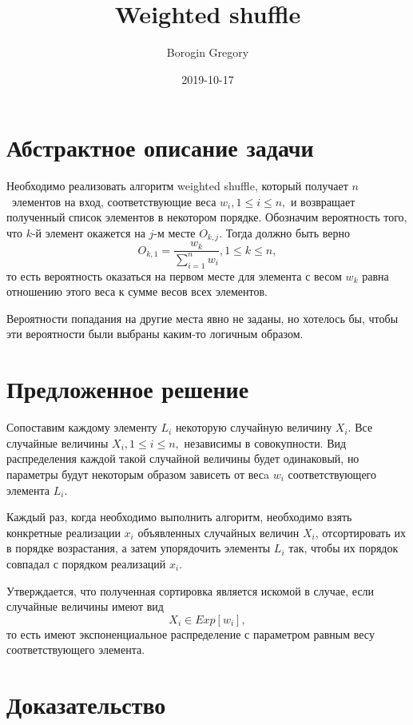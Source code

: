\documentclass{article}
\title{Weighted shuffle}
\date{2019-10-17}
\author{Borogin Gregory}
\begin{document}
    \maketitle
    \newpage

    \section{Абстрактное описание задачи}

    Необходимо реализовать алгоритм weighted shuffle, который получает $n$~элементов на вход,
    соответствующие веса $w_i, 1\leq{}i\leq{}n,$ и возвращает полученный список элементов в некотором порядке.
    Обозначим вероятность того, что $k$-й элемент окажется на $j$-м месте $O_{k,j}$. Тогда должно быть верно
    $$O_{k,1}=\frac{w_k}{\sum_{i=1}^{n} w_i}, 1\leq{}k\leq{}n,$$
    то есть вероятность оказаться на первом месте для элемента с весом $w_k$ равна отношению этого веса
    к сумме весов всех элементов.

    Вероятности попадания на другие места явно не заданы, но хотелось бы, чтобы эти вероятности были
    выбраны каким-то логичным образом.

    \section{Предложенное решение}

    Сопоставим каждому элементу $L_i$ некоторую случайную величину $X_i$.
    Все случайные величины $X_i, 1\leq{}i\leq{}n,$ независимы в совокупности.
    Вид распределения каждой такой случайной величины будет одинаковый,
    но параметры будут некоторым образом зависеть от весa $w_i$ соответствующего элемента $L_i$.

    Каждый раз, когда необходимо выполнить алгоритм, необходимо взять конкретные реализации $x_i$
    объявленных случайных величин $X_i$, отсортировать их в порядке возрастания,
    а затем упорядочить элементы $L_i$ так, чтобы их порядок совпадал с порядком реализаций $x_i$.

    Утверждается, что полученная сортировка является искомой в случае, если случайные величины имеют вид
    $$X_i\in{}Exp[w_i],$$
    то есть имеют экспоненциальное распределение с параметром равным весу соответствующего элемента.

    \section{Доказательство}
\end{document}
